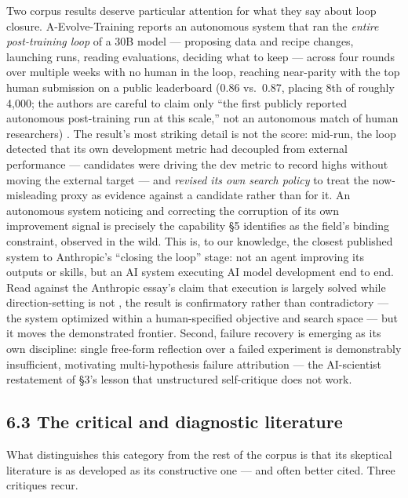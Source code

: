 \documentclass[
  11pt,
]{article}
\begin{document}
Two corpus results deserve particular attention for what they say about
loop closure. A-Evolve-Training reports an autonomous system that ran
the \emph{entire post-training loop} of a 30B model --- proposing data
and recipe changes, launching runs, reading evaluations, deciding what
to keep --- across four rounds over multiple weeks with no human in the
loop, reaching near-parity with the top human submission on a public
leaderboard (0.86 vs.~0.87, placing 8th of roughly 4,000; the authors
are careful to claim only ``the first publicly reported autonomous
post-training run at this scale,'' not an autonomous match of human
researchers) \citep{shi2026evolve}. The result's most striking detail is
not the score: mid-run, the loop detected that its own development
metric had decoupled from external performance --- candidates were
driving the dev metric to record highs without moving the external
target --- and \emph{revised its own search policy} to treat the
now-misleading proxy as evidence against a candidate rather than for it.
An autonomous system noticing and correcting the corruption of its own
improvement signal is precisely the capability §5 identifies as the
field's binding constraint, observed in the wild. This is, to our
knowledge, the closest published system to Anthropic's ``closing the
loop'' stage: not an agent improving its outputs or skills, but an AI
system executing AI model development end to end. Read against the
Anthropic essay's claim that execution is largely solved while
direction-setting is not \citep{anthropic2026rsi}, the result is
confirmatory rather than contradictory --- the system optimized within a
human-specified objective and search space --- but it moves the
demonstrated frontier. Second, failure recovery is emerging as its own
discipline: single free-form reflection over a failed experiment is
demonstrably insufficient, motivating multi-hypothesis failure
attribution \citep{y2026one} --- the AI-scientist restatement of §3's
lesson that unstructured self-critique does not work.

\subsection{6.3 The critical and diagnostic
literature}\label{the-critical-and-diagnostic-literature}

What distinguishes this category from the rest of the corpus is that its
skeptical literature is as developed as its constructive one --- and
often better cited. Three critiques recur.
\end{document}
